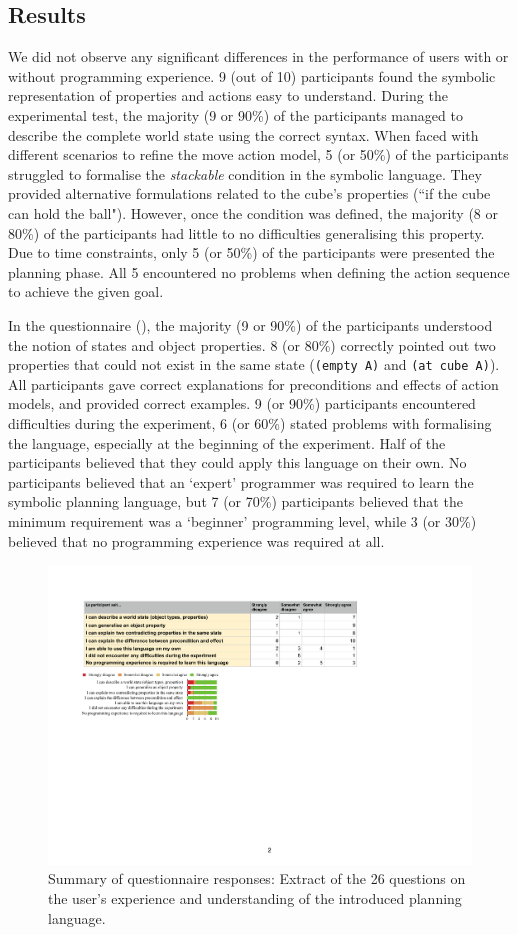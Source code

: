 \subsection{Results}
We did not observe any significant differences in the performance of users with or without programming experience.
9 (out of 10) participants found the symbolic representation of properties and actions easy to understand.
During the experimental test, the majority (9 or 90\%) of the participants managed to describe the complete world state using the correct syntax.
When faced with different scenarios to refine the move action model, 5 (or 50\%) of the participants struggled to formalise the \textit{stackable} condition in the symbolic language.
They provided alternative formulations related to the cube's properties (\eg ``if the cube can hold the ball").
However, once the condition was defined, the majority (8 or 80\%) of the participants had little to no difficulties generalising this property.
Due to time constraints, only 5 (or 50\%) of the participants were presented the planning phase.
All 5 encountered no problems when defining the action sequence to achieve the given goal.

In the questionnaire (), the majority (9 or 90\%) of the participants understood the notion of states and object properties.
8 (or 80\%) correctly pointed out two properties that could not exist in the same state (\eg \texttt{(empty A)} and \texttt{(at cube A)}).
All participants gave correct explanations for preconditions and effects of action models, and provided correct examples.
9 (or 90\%) participants encountered difficulties during the experiment, 6 (or 60\%) stated problems with formalising the language, especially at the beginning of the experiment.
Half of the participants believed that they could apply this language on their own.
No participants believed that an `expert' programmer was required to learn the symbolic planning language, but 7 (or 70\%) participants believed that the minimum requirement was a `beginner' programming level, while 3 (or 30\%) believed that no programming experience was required at all.


\begin{figure}[ht]
	\centering
	\includegraphics[width=0.85\linewidth]{figures/eEvaluation2}
	\caption{Summary of questionnaire responses: Extract of the 26 questions on the user's experience and understanding of the introduced planning language.}
	\label{fig:eEvaluation2}
\end{figure} 